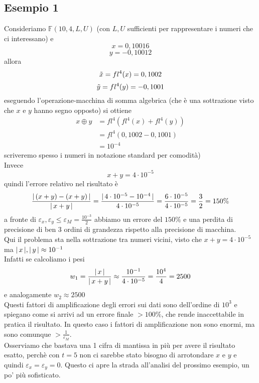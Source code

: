 \documentclass[12pt]{article}
\DeclarePairedDelimiter{\abs}{\lvert}{\rvert}
\begin{document}
\subsection{Esempio 1}
Consideriamo $\mathbb{F}(10,4,L,U)$ (con $L,U$ sufficienti per rappresentare i numeri che ci interessano) e \[x = 0,10016\]  \[y = -0,10012\]
allora \[\Tilde{x} = fl^4(x) = 0,1002\]  \[\Tilde{y} = fl^4(y) = -0,1001\]
eseguendo l’operazione-macchina di somma algebrica (che è una sottrazione visto che $x$ e $y$ hanno segno opposto) si ottiene
\[\begin{split}
    x \oplus y & = fl^4(fl^4(x) + fl^4(y)) \\
    & = fl^4(0,1002 -0,1001) \\
    & = 10^{-4}
\end{split}\]
scriveremo spesso i numeri in notazione standard per comodità) \\
Invece \[x+y=4 \cdot 10^{-5}\] quindi l’errore relativo nel risultato è
\[ \frac{\abs{\,(x+y)-(x+y)\,}}{\abs{\,x+y\,}} = \frac{\abs{\,4 \cdot 10^{-5} - 10^{-4}\,}}{4 \cdot10^{-5}} = \frac{6 \cdot 10^{-5}}{4 \cdot 10^{-5}} = \frac{3}{2} = 150\%\]
a fronte di $\varepsilon_x, \varepsilon_y \le \varepsilon_M = \frac{10^{-3}}{2}$ abbiamo un errore del $150\%$ e una perdita di precisione di ben 3 ordini di grandezza rispetto alla precisione di macchina.\\
Qui il problema sta nella sottrazione tra numeri vicini, visto che $x+y=4 \cdot 10^{-5}$ ma $\abs{\,x\,},\abs{\,y\,} \approx 10^{-1}$\\
Infatti se calcoliamo i pesi 
\[ w_1 = \frac{\abs{\,x\,}}{\abs{\,x+y\,}} \approx \frac{10^{-1}}{4 \cdot 10^{-5}} = \frac{10^4}{4} = 2500\] e analogamente $w_2 \approx 2500$\\
Questi fattori di amplificazione degli errori sui dati sono dell'ordine di $10^3$ e spiegano come si arrivi ad un errore finale $>100\%$, che rende inaccettabile in pratica il risultato. In questo caso i fattori di amplificazione non sono enormi, ma sono comunque $> \frac{1}{\varepsilon_M}$. \\
Osserviamo che bastava una 1 cifra di mantissa in più per avere il risultato esatto, perchè con $t=5$ non ci sarebbe stato bisogno di arrotondare $x$ e $y$ e quindi $\varepsilon_x = \varepsilon_y = 0$. 
\newline \newline
Questo ci apre la strada all'analisi del prossimo esempio, un po’ più sofisticato.
\end{document}
